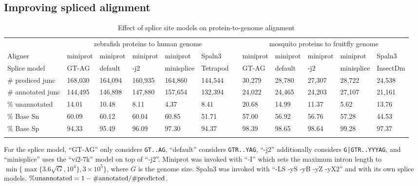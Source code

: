 \documentclass[webpdf,contemporary,large,namedate]{oup-authoring-template}%
\begin{document}
\subsection{Improving spliced alignment}

\begin{table*}[!tb]
\caption{Effect of splice site models on protein-to-genome alignment\label{tab:eval}}
\begin{tabular*}{\textwidth}{@{\extracolsep\fill}llllllclllll@{\extracolsep\fill}}
\toprule
& \multicolumn{5}{c}{zebrafish proteins to human genome} && \multicolumn{5}{c}{mosquito proteins to fruitfly genome} \\
\cline{2-6}\cline{8-12}
Aligner           & miniprot  & miniprot  & miniprot  & miniprot   & Spaln3    && miniprot & miniprot & miniprot & miniprot   & Spaln3 \\
Splice model      & GT-AG     & default   & -j2       & minisplice & Tetrapod  && GT-AG    & default  & -j2      & minisplice & InsectDm \\
\midrule
\# prediced junc  & 168,030   & 164,094   & 160,935   & 164,860    & 144,544   && 30,279   & 28,780   & 27,307   & 28,722     & 24,538 \\
\# annotated junc & 144,495   & 146,898   & 147,880   & 157,654    & 132,394   && 24,022   & 24,465   & 24,203   & 27,107     & 21,161 \\
\% unannotated    & 14.01     & 10.48     & 8.11      & 4.37       & 8.41      && 20.68    & 14.99    & 11.37    & 5.62       & 13.76 \\
\% Base Sn        & 60.09     & 60.12     & 60.04     & 60.85      & 51.71     && 57.00    & 56.92    & 56.76    & 57.28      & 44.53 \\
\% Base Sp        & 94.33     & 95.49     & 96.09     & 97.30      & 94.37     && 98.39    & 98.65    & 98.64    & 99.28      & 97.37 \\
\botrule
\end{tabular*}
\begin{tablenotes}\setlength\itemsep{0.0em}
For the splice model, ``GT-AG'' only considers {\tt GT..AG},
``default'' considers {\tt GTR..YAG},
``-j2'' additionally considers {\tt G|GTR..YYYAG},
and ``minisplice'' uses the ``vi2-7k'' model on top of ``-j2''.
Miniprot was invoked with ``-I'' which sets the maximum intron length to $\min\{\max\{3.6\sqrt{G},10^4\},3\times10^5\}$, where $G$ is the genome size.
Spaln3 was invoked with ``-LS -yS -yB -yZ -yX2'' and with its own splice models.
${\rm\%unannotated}=1-{\rm\#annotated}/{\rm\#predicted}$.
\end{tablenotes}
\end{table*}
\end{document}
